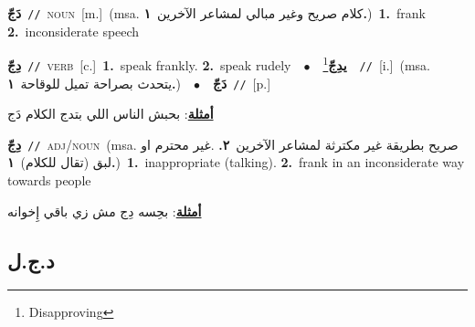 \documentclass[10pt,a4paper,twoside]{article} %
\begin{document}
\begin{multicols}{2}
{{{{{{{{{{\setlength\topsep{0pt}\textbf{\foreignlanguage{arabic}{دَجّ}}\ {\color{gray}\texttt{//}\color{black}}\ \textsc{noun}\ [m.]\ \color{gray}(msa. \foreignlanguage{arabic}{كلام صريح وغير مبالي لمشاعر الآخرين}~\foreignlanguage{arabic}{\textbf{١.}})\color{black}\ \textbf{1.}~frank  \textbf{2.}~inconsiderate speech\ 

{\setlength\topsep{0pt}\textbf{\foreignlanguage{arabic}{دِجّ}}\ {\color{gray}\texttt{//}\color{black}}\ \textsc{verb}\ [c.]\ \textbf{1.}~speak frankly.  \textbf{2.}~speak rudely\ \ $\bullet$\ \ \setlength\topsep{0pt}\textbf{\foreignlanguage{arabic}{يدِجّ}}\footnote{Disapproving}\ \ {\color{gray}\texttt{//}\color{black}}\ [i.]\ \color{gray}(msa. \foreignlanguage{arabic}{يتحدث بصراحة تميل للوقاحة}~\foreignlanguage{arabic}{\textbf{١.}})\color{black}\ \ $\bullet$\ \ \setlength\topsep{0pt}\textbf{\foreignlanguage{arabic}{دَجّ}}\ {\color{gray}\texttt{//}\color{black}}\ [p.]\  \begin{flushright}\color{gray}\foreignlanguage{arabic}{\textbf{\underline{\foreignlanguage{arabic}{أمثلة}}}: بحبش الناس اللي بتدج الكلام دَج}\end{flushright}\color{black}} \vspace{2mm}

{\setlength\topsep{0pt}\textbf{\foreignlanguage{arabic}{دِجّ}}\ {\color{gray}\texttt{//}\color{black}}\ \textsc{adj/noun}\ \color{gray}(msa. \foreignlanguage{arabic}{صريح بطريقة غير مكترثة لمشاعر الآخرين}~\foreignlanguage{arabic}{\textbf{٢.}}  .\foreignlanguage{arabic}{غير محترم او لبق (تقال للكلام)}~\foreignlanguage{arabic}{\textbf{١.}})\color{black}\ \textbf{1.}~inappropriate (talking).  \textbf{2.}~frank in an inconsiderate way towards people\  \begin{flushright}\color{gray}\foreignlanguage{arabic}{\textbf{\underline{\foreignlanguage{arabic}{أمثلة}}}: بحِسه دِج مش زي باقي إِخوانه}\end{flushright}\color{black}} \vspace{2mm}

\vspace{-3mm}
\subsection*{\color{blue}\foreignlanguage{arabic}{د.ج.ل}\color{blue}{}} 

}}}}}}}}}}
\end{multicols}
\end{document}
